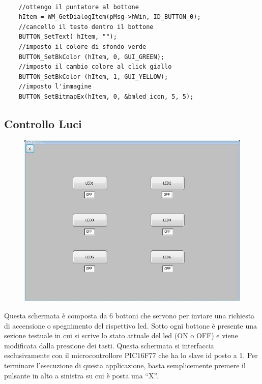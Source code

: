 \documentclass[a4paper,titlepage]{book}
\begin{document}
\begin{lstlisting}

    //ottengo il puntatore al bottone
    hItem = WM_GetDialogItem(pMsg->hWin, ID_BUTTON_0);
    //cancello il testo dentro il bottone
    BUTTON_SetText( hItem, "");
    //imposto il colore di sfondo verde
    BUTTON_SetBkColor (hItem, 0, GUI_GREEN);
    //imposto il cambio colore al click giallo 
    BUTTON_SetBkColor (hItem, 1, GUI_YELLOW);
    //imposto l'immagine
    BUTTON_SetBitmapEx(hItem, 0, &bmled_icon, 5, 5);

\end{lstlisting} 

\newpage
\subsection{Controllo Luci}

\begin{figure}[!h]
\centering
\includegraphics[scale=0.6]{ledgui.jpg}
\end{figure}

Questa schermata è composta da 6 bottoni che servono per inviare una richiesta di accensione o spegnimento del rispettivo led. Sotto ogni bottone è presente una sezione testuale in cui si scrive lo stato attuale del led (ON o OFF) e viene modificata dalla pressione dei tasti. Questa schermata si interfaccia esclusivamente con il microcontrollore PIC16F77 che ha lo slave id posto a 1. Per terminare l'esecuzione di questa applicazione, basta semplicemente premere il pulsante in alto a sinistra su cui è posta una ``X''.

~
\end{document}
